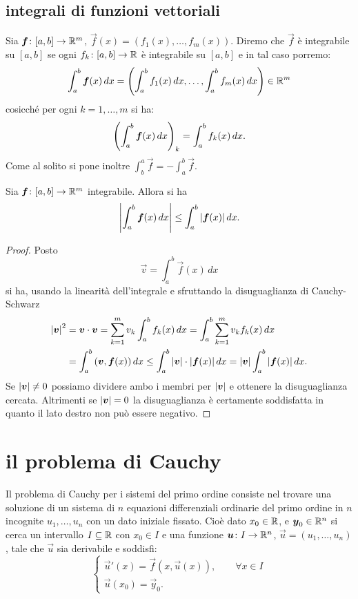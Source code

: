 \subsection{integrali di funzioni vettoriali}

\begin{definition}
Sia $\boldsymbol f\colon [a,b]\to {\mathbb R}^m$, $\vec f(x) = (f_1(x), \dots, f_m(x))$.
Diremo che $\vec f$ è integrabile su $[a,b]$ se ogni
$f_k\colon[a,b]\to {\mathbb R}$ è integrabile su $[a,b]$ e in tal caso porremo:
\[
  \int_a^b \boldsymbol f(x)\, dx
  = {\left( \int_a^b f_1(x)\, dx, \dots, \int_a^b f_m(x)\, dx \right)}
  \in {\mathbb R}^m
\]
cosicché per ogni $k=1,\dots, m$ si ha:
\[
  {\left( \int_a^b \boldsymbol f(x)\, dx \right)}_k = \int_a^b f_k(x)\, dx.
\]
Come al solito si pone inoltre $\int_b^a \vec f = - \int_a^b \vec f$.
\end{definition}

\begin{theorem}\label{teo:tipo_jensen}
\label{th:stima_modulo_integrale}%
\mymark{*}%
Sia $\boldsymbol f\colon [a,b]\to {\mathbb R}^m$ integrabile. Allora si ha
\[
  {\left|\int_a^b \boldsymbol f(x)\, dx\right|} \le \int_a^b {\left|\boldsymbol f(x)\right|}\, dx.
\]
\end{theorem}
%
\begin{proof}
Posto
\[
 \vec v = \int_a^b \vec f(x)\, dx
\]
si ha, usando la linearità dell'integrale
e sfruttando la disuguaglianza di Cauchy-Schwarz
\begin{align*}
  {\left|\boldsymbol v\right|}^2
  &= \boldsymbol v \cdot \boldsymbol v
   = \sum_{k=1}^m v_k \int_a^b f_k(x)\, dx
   = \int_a^b \sum_{k=1}^m v_k f_k(x)\, dx \\
  &= \int_a^b {\left( \boldsymbol v, \boldsymbol f(x) \right)}\, dx
  \le \int_a^b {\left|\boldsymbol v\right|}\cdot {\left|\boldsymbol f(x)\right|}\, dx
  = {\left|\boldsymbol v\right|} \int_a^b {\left|\boldsymbol f(x)\right|}\, dx.
\end{align*}
Se ${\left|\boldsymbol v\right|}\neq 0$ possiamo dividere ambo i membri per ${\left|\boldsymbol v\right|}$ e
ottenere la disuguaglianza cercata.
Altrimenti se ${\left|\boldsymbol v\right|}=0$ la disuguaglianza è certamente soddisfatta in
quanto il lato destro non può essere negativo.
\end{proof}


\section{il problema di Cauchy}

Il problema di Cauchy per i sistemi del primo ordine
consiste nel
trovare una soluzione di un sistema di 
$n$ equazioni differenziali ordinarie del primo ordine in $n$ incognite
$u_1, \dots, u_n$
con un dato iniziale fissato. 
Cioè dato $x_0\in {\mathbb R}$,
e $\boldsymbol y_0 \in {\mathbb R}^n$ si cerca un intervallo $I\subseteq {\mathbb R}$ con $x_0\in I$ 
e una funzione $\boldsymbol u \colon I\to {\mathbb R}^n$,
$\vec u = (u_1, \dots, u_n)$, tale
che $\vec u$ sia derivabile e soddisfi:
\begin{equation}\label{eq:problema_cauchy}
\begin{cases}
 \vec u'(x) = \vec f(x, \vec u(x)), \qquad \forall x\in I\\
 \vec u(x_0) = \vec y_0.
\end{cases}
\end{equation}


